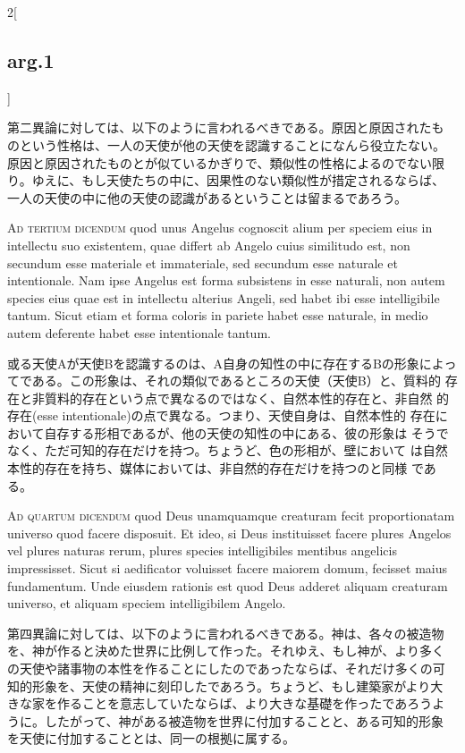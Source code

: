 \documentclass[paper=a4paper,fontsize=10pt,jafontsize=9pt,titlepage]{jlreq}
\begin{document}
\begin{paracol}{2}[\subsection{arg.1}]
\switchcolumn

第二異論に対しては、以下のように言われるべきである。原因と原因されたも
のという性格は、一人の天使が他の天使を認識することになんら役立たない。
原因と原因されたものとが似ているかぎりで、類似性の性格によるのでない限
り。ゆえに、もし天使たちの中に、因果性のない類似性が措定されるならば、
一人の天使の中に他の天使の認識があるということは留まるであろう。

\switchcolumn*[\subsection{ad.3}]

{\scshape Ad tertium dicendum} quod unus Angelus cognoscit alium per
speciem eius in intellectu suo existentem, quae differt ab Angelo
cuius similitudo est, non secundum esse materiale et immateriale, sed
secundum esse naturale et intentionale. Nam ipse Angelus est forma
subsistens in esse naturali, non autem species eius quae est in
intellectu alterius Angeli, sed habet ibi esse intelligibile
tantum. Sicut etiam et forma coloris in pariete habet esse naturale,
in medio autem deferente habet esse intentionale tantum.

\switchcolumn

或る天使Aが天使Bを認識するのは、A自身の知性の中に存在するBの形象によっ
てである。この形象は、それの類似であるところの天使（天使B）と、質料的
存在と非質料的存在という点で異なるのではなく、自然本性的存在と、非自然
的存在(esse intentionale)の点で異なる。つまり、天使自身は、自然本性的
存在において自存する形相であるが、他の天使の知性の中にある、彼の形象は
そうでなく、ただ可知的存在だけを持つ。ちょうど、色の形相が、壁において
は自然本性的存在を持ち、媒体においては、非自然的存在だけを持つのと同様
である。

\switchcolumn*[\subsection{ad.4}]

{\scshape Ad quartum dicendum} quod Deus unamquamque creaturam fecit
proportionatam universo quod facere disposuit. Et ideo, si Deus
instituisset facere plures Angelos vel plures naturas rerum, plures
species intelligibiles mentibus angelicis impressisset. Sicut si
aedificator voluisset facere maiorem domum, fecisset maius
fundamentum. Unde eiusdem rationis est quod Deus adderet aliquam
creaturam universo, et aliquam speciem intelligibilem Angelo.

\switchcolumn

第四異論に対しては、以下のように言われるべきである。神は、各々の被造物
を、神が作ると決めた世界に比例して作った。それゆえ、もし神が、より多く
の天使や諸事物の本性を作ることにしたのであったならば、それだけ多くの可
知的形象を、天使の精神に刻印したであろう。ちょうど、もし建築家がより大
きな家を作ることを意志していたならば、より大きな基礎を作ったであろうよ
うに。したがって、神がある被造物を世界に付加することと、ある可知的形象
を天使に付加することとは、同一の根拠に属する。

\end{paracol}
\end{document}
